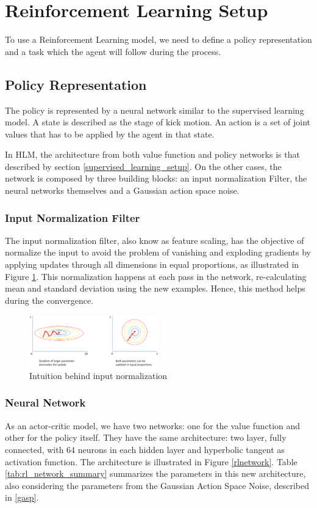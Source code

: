 \section{Reinforcement Learning Setup}

To use a Reinforcement Learning model, we need to define a policy representation and a task which the agent will follow during the process.

\subsection{Policy Representation}

The policy is represented by a neural network similar to the supervised learning model. A state is described as the stage of kick motion. An action is a set of joint values that has to be applied by the agent in that state.

In HLM, the architecture from both value function and policy networks is that described by section \ref{supervised_learning_setup}. On the other cases, the network is composed by three building blocks: an input normalization Filter, the neural networks themselves and a Gaussian action space noise.

\subsubsection{Input Normalization Filter}\label{sec:inputnorm}
The input normalization filter, also know as feature scaling, has the objective of normalize the input to avoid the problem of vanishing and exploding gradients by applying updates through all dimensions in equal proportions, as illustrated in Figure \ref{inputnormfig}. This normalization happens at each pass in the network, re-calculating mean and standard deviation using the new examples. Hence, this method helps during the convergence.

\begin{figure}[!htbp]
	\centering
	\includegraphics[width=0.5\textwidth]{Cap5/inputnorm.eps}
	\caption{Intuition behind input normalization}
	\label{inputnormfig}
\end{figure}

\subsubsection{Neural Network}
As an actor-critic model, we have two networks: one for the value function and other for the policy itself. They have the same architecture: two layer, fully connected, with 64 neurons in each hidden layer and hyperbolic tangent as activation function. The architecture is illustrated in Figure \ref{rlnetwork}. Table \ref{tab:rl_network_summary} summarizes the parameters in this new architecture, also considering the parameters from the Gaussian Action Space Noise, described in \ref{gasp}.

